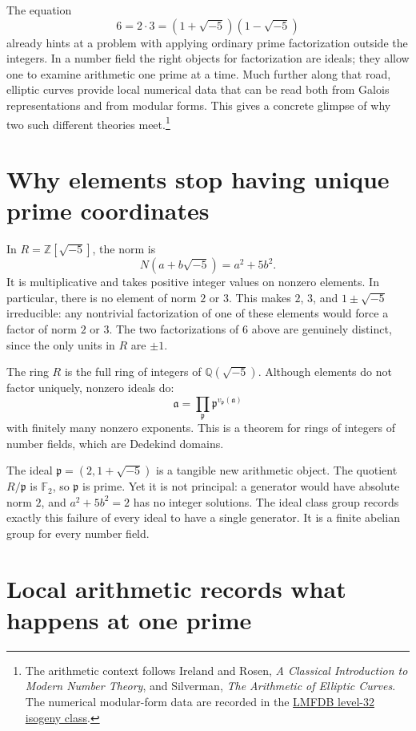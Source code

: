 
The equation
\[
 6=2\cdot3=(1+\sqrt{-5})(1-\sqrt{-5})
\]
already hints at a problem with applying ordinary prime factorization outside the integers. In a number field the right objects for factorization are ideals; they allow one to examine arithmetic one prime at a time. Much further along that road, elliptic curves provide local numerical data that can be read both from Galois representations and from modular forms. This gives a concrete glimpse of why two such different theories meet.\footnote{The arithmetic context follows Ireland and Rosen, \emph{A Classical Introduction to Modern Number Theory}, and Silverman, \emph{The Arithmetic of Elliptic Curves}. The numerical modular-form data are recorded in the \href{https://www.lmfdb.org/EllipticCurve/Q/32/a/}{LMFDB level-32 isogeny class}.}

\section{Why elements stop having unique prime coordinates}

In \(R=\mathbb Z[\sqrt{-5}]\), the norm is
\[
 N(a+b\sqrt{-5})=a^2+5b^2.
\]
It is multiplicative and takes positive integer values on nonzero elements. In particular, there is no element of norm \(2\) or \(3\). This makes \(2\), \(3\), and \(1\pm\sqrt{-5}\) irreducible: any nontrivial factorization of one of these elements would force a factor of norm \(2\) or \(3\). The two factorizations of \(6\) above are genuinely distinct, since the only units in \(R\) are \(\pm1\).

The ring \(R\) is the full ring of integers of \(\mathbb Q(\sqrt{-5})\). Although elements do not factor uniquely, nonzero ideals do:
\[
 \mathfrak a=\prod_{\mathfrak p}\mathfrak p^{v_{\mathfrak p}(\mathfrak a)}
\]
with finitely many nonzero exponents. This is a theorem for rings of integers of number fields, which are Dedekind domains.

The ideal \(\mathfrak p=(2,1+\sqrt{-5})\) is a tangible new arithmetic object. The quotient \(R/\mathfrak p\) is \(\mathbb F_2\), so \(\mathfrak p\) is prime. Yet it is not principal: a generator would have absolute norm \(2\), and \(a^2+5b^2=2\) has no integer solutions. The ideal class group records exactly this failure of every ideal to have a single generator. It is a finite abelian group for every number field.

\section{Local arithmetic records what happens at one prime}


